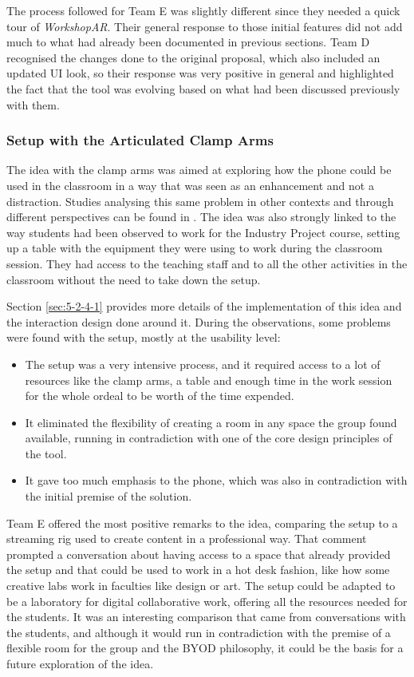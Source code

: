 The process followed for Team E was slightly different since they needed a quick tour of \emph{WorkshopAR}. Their general response to those initial features did not add
much to what had already been documented in previous sections. Team D recognised the changes done to the original proposal, which also included an updated UI look, so
their response was very positive in general and highlighted the fact that the tool was evolving based on what had been discussed previously with them.

\subsubsection{Setup with the Articulated Clamp Arms \label{sec:6-8-2-1}}

The idea with the clamp arms was aimed at exploring how the phone could be used in the classroom in a way that was seen as an enhancement and not a distraction. Studies
analysing this same problem in other contexts and through different perspectives can be found in \textcite{forsling_2023,flanigan_2023,falth_2024,consoli_2025}. The idea
was also strongly linked to the way students had been observed to work for the Industry Project course, setting up a table with the equipment they were using to work
during the classroom session. They had access to the teaching staff and to all the other activities in the classroom without the need to take down the setup.

Section \ref{sec:5-2-4-1} provides more details of the implementation of this idea and the interaction design done around it. During the observations, some problems were
found with the setup, mostly at the usability level:

\begin{itemize}
    \item The setup was a very intensive process, and it required access to a lot of resources like the clamp arms, a table and enough time in the work session for the
    whole ordeal to be worth of the time expended.
    \item It eliminated the flexibility of creating a room in any space the group found available, running in contradiction with one of the core design principles of the tool.
    \item It gave too much emphasis to the phone, which was also in contradiction with the initial premise of the solution.
\end{itemize}

Team E offered the most positive remarks to the idea, comparing the setup to a streaming rig used to create content in a professional way. That comment prompted a
conversation about having access to a space that already provided the setup and that could be used to work in a hot desk fashion, like how some creative labs work in
faculties like design or art. The setup could be adapted to be a laboratory for digital collaborative work, offering all the resources needed for the students. It was an
interesting comparison that came from conversations with the students, and although it would run in contradiction with the premise of a flexible room for the group and
the \ac{BYOD} philosophy, it could be the basis for a future exploration of the idea.

